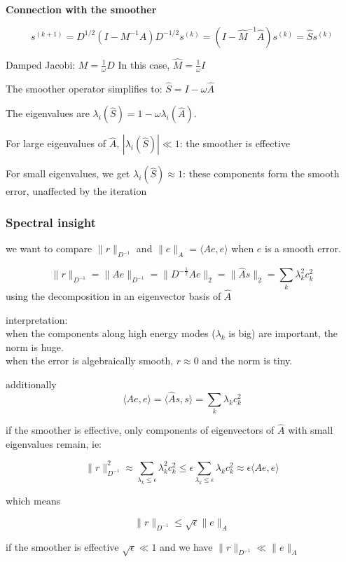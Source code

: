 \documentclass{article}
\begin{document}
\textbf{Connection with the smoother}

\[
s^{(k+1)} = D^{1/2}\left(I - M^{-1}A\right)D^{-1/2}s^{(k)} = \left(I - \hat{M}^{-1}\hat{A}\right)s^{(k)} = \hat{S}s^{(k)}
\]

Damped Jacobi: $M = \frac{1}{\omega}D$
In this case, $\hat{M} = \frac{1}{\omega}I$

The smoother operator simplifies to: $\hat{S} = I - \omega \hat{A}$

The eigenvalues are $\lambda_i(\hat{S}) = 1 - \omega \lambda_i(\hat{A})$.

For large eigenvalues of $\hat{A}$, $|\lambda_i(\hat{S})| \ll 1$: the smoother is effective

For small eigenvalues, we get $\lambda_i(\hat{S}) \approx 1$: these components form the smooth error, unaffected by the iteration

\subsubsection*{Spectral insight}

we want to compare $\|r\|_{D^{-1}} $ and $\|e\|_{A} = \langle Ae,e \rangle$ when $e$ is a smooth error.

\[
\|r\|_{D^{-1}} = \|Ae\|_{D^{-1}} = \|D^{-\frac{1}{2}}Ae\|_{2} = \|\hat{A}s\|_{2} = \sum_{k}{\lambda_{k}^2c_{k}^{2}}
\]
using the decomposition in an eigenvector basis of $\hat{A}$

interpretation: \\
when the components along high energy modes ($\lambda_{k}$ is big) are important, the norm is huge. \\
when the error is algebraically smooth, $r \approx 0$ and the norm is tiny. 

additionally
\[
\langle Ae,e \rangle = \langle \hat{A}s,s \rangle = \sum_{k}{\lambda_{k}c_{k}^{2}}
\]


if the smoother is effective, only components of eigenvectors of $\hat{A}$ with small eigenvalues remain, ie:

\[
\|r\|_{D^{-1}}^{2} \approx \sum_{\lambda_{k} \le \epsilon}{\lambda_{k}^{2}c_{k}^{2}} \le \epsilon \sum_{\lambda_{k} \le \epsilon}{\lambda_{k}c_{k}^{2}} \approx \epsilon \langle Ae,e \rangle
\]

which means

\[
\|r\|_{D^{-1}} \le \sqrt{\epsilon}\|e\|_{A}
\]

if the smoother is effective $\sqrt{\epsilon} \ll 1$ and we have $\|r\|_{D^{-1}} \ll  \|e\|_{A}$
\end{document}
